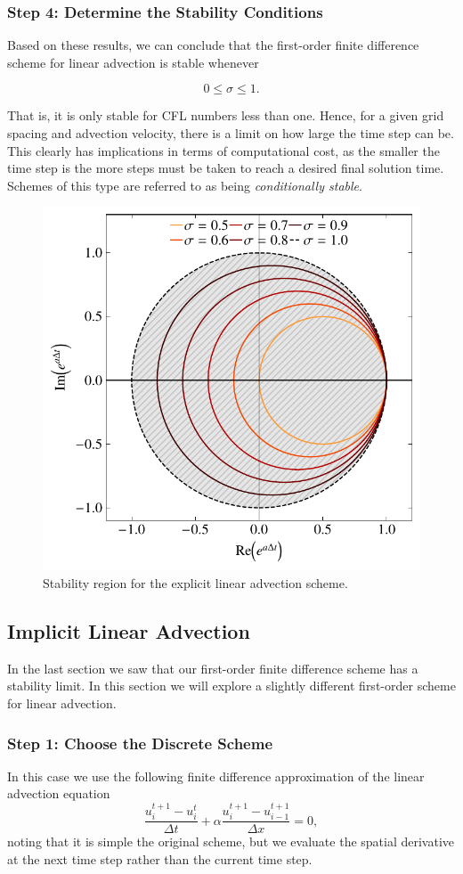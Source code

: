 \subsubsection{Step 4: Determine the Stability Conditions}
Based on these results, we can conclude that the first-order finite difference scheme for linear advection is stable whenever
\begin{eqBox}
\begin{equation}
	0 \leq \sigma \leq 1.
\end{equation}
\end{eqBox}
That is, it is only stable for CFL numbers less than one. Hence, for a given grid spacing and advection velocity, there is a limit on how large the time step can be. This clearly has implications in terms of computational cost, as the smaller the time step is the more steps must be taken to reach a desired final solution time. Schemes of this type are referred to as being {\it conditionally stable}.


\begin{figure}[htbp]
	\centering
	\includegraphics[width=0.6\linewidth]{Pictures/ch12_explicit_advection}
	\caption{Stability region for the explicit linear advection scheme.}
	\label{fig:explicit_advection}
\end{figure}

\subsection{Implicit Linear Advection}
In the last section we saw that our first-order finite difference scheme has a stability limit. In this section we will explore a slightly different first-order scheme for linear advection.

\subsubsection{Step 1: Choose the Discrete Scheme}
In this case we use the following finite difference approximation of the linear advection equation
\begin{equation}
	\frac{u_i^{t+1} - u_{i}^t}{\Delta t} +  \alpha \frac{u_i^{t+1} - u_{i-1}^{t+1}}{\Delta x} = 0,
\end{equation}
noting that it is simple the original scheme, but we evaluate the spatial derivative at the next time step rather than the current time step.

